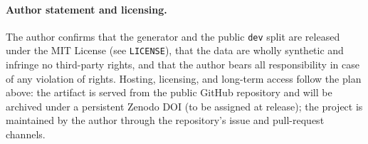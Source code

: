 \paragraph{Author statement and licensing.}
The author confirms that the generator and the public \texttt{dev} split are released
under the MIT License (see \texttt{LICENSE}), that the data are wholly synthetic and
infringe no third-party rights, and that the author bears all responsibility in case of
any violation of rights. Hosting, licensing, and long-term access follow the plan above:
the artifact is served from the public GitHub repository and will be archived under a
persistent Zenodo DOI (to be assigned at release); the project is maintained by the author
through the repository's issue and pull-request channels.
